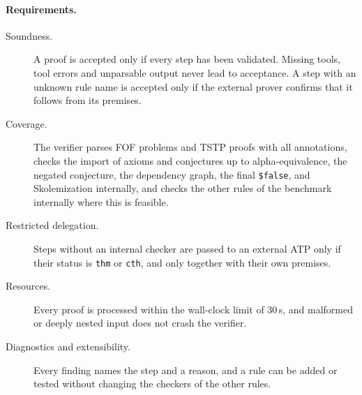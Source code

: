 \paragraph{Requirements.}
\label{subsec:req-list}

\begin{description}
  \item[Soundness.] A proof is accepted only if every step has been validated. Missing tools, tool errors and unparsable output never lead to acceptance. A step with an unknown rule name is accepted only if the external prover confirms that it follows from its premises.
  \item[Coverage.] The verifier parses FOF problems and TSTP proofs with all annotations, checks the import of axioms and conjectures up to alpha-equivalence, the negated conjecture, the dependency graph, the final \texttt{\$false}, and Skolemization internally, and checks the other rules of the benchmark internally where this is feasible.
  \item[Restricted delegation.] Steps without an internal checker are passed to an external ATP only if their status is \texttt{thm} or \texttt{cth}, and only together with their own premises.
  \item[Resources.] Every proof is processed within the wall-clock limit of 30\,s, and malformed or deeply nested input does not crash the verifier.
  \item[Diagnostics and extensibility.] Every finding names the step and a reason, and a rule can be added or tested without changing the checkers of the other rules.
\end{description}

